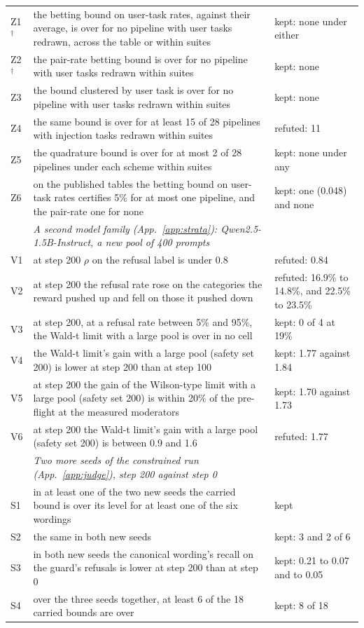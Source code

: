 \begin{tabular}{@{}l p{7.4cm} p{7.4cm}@{}}
Z1$^\dagger$ & the betting bound on user-task rates, against their average, is over for no pipeline with user tasks redrawn, across the table or within suites & kept: none under either \\
Z2$^\dagger$ & the pair-rate betting bound is over for no pipeline with user tasks redrawn within suites & kept: none \\
Z3 & the bound clustered by user task is over for no pipeline with user tasks redrawn within suites & kept: none \\
Z4 & the same bound is over for at least 15 of 28 pipelines with injection tasks redrawn within suites & refuted: 11 \\
Z5 & the quadrature bound is over for at most 2 of 28 pipelines under each scheme within suites & kept: none under any \\
Z6 & on the published tables the betting bound on user-task rates certifies 5\% for at most one pipeline, and the pair-rate one for none & kept: one (0.048) and none \\
 & \emph{A second model family (App.~\ref{app:strata}): Qwen2.5-1.5B-Instruct, a new pool of 400 prompts} &  \\
V1 & at step 200 $\rho$ on the refusal label is under 0.8 & refuted: 0.84 \\
V2 & at step 200 the refusal rate rose on the categories the reward pushed up and fell on those it pushed down & refuted: 16.9\% to 14.8\%, and 22.5\% to 23.5\% \\
V3 & at step 200, at a refusal rate between 5\% and 95\%, the Wald-t limit with a large pool is over in no cell & kept: 0 of 4 at 19\% \\
V4 & the Wald-t limit's gain with a large pool (safety set 200) is lower at step 200 than at step 100 & kept: 1.77 against 1.84 \\
V5 & at step 200 the gain of the Wilson-type limit with a large pool (safety set 200) is within 20\% of the pre-flight at the measured moderators & kept: 1.70 against 1.73 \\
V6 & at step 200 the Wald-t limit's gain with a large pool (safety set 200) is between 0.9 and 1.6 & refuted: 1.77 \\
 & \emph{Two more seeds of the constrained run (App.~\ref{app:judge}), step 200 against step 0} &  \\
S1 & in at least one of the two new seeds the carried bound is over its level for at least one of the six wordings & kept \\
S2 & the same in both new seeds & kept: 3 and 2 of 6 \\
S3 & in both new seeds the canonical wording's recall on the guard's refusals is lower at step 200 than at step 0 & kept: 0.21 to 0.07 and to 0.05 \\
S4 & over the three seeds together, at least 6 of the 18 carried bounds are over & kept: 8 of 18 \\
\bottomrule
\end{tabular}
